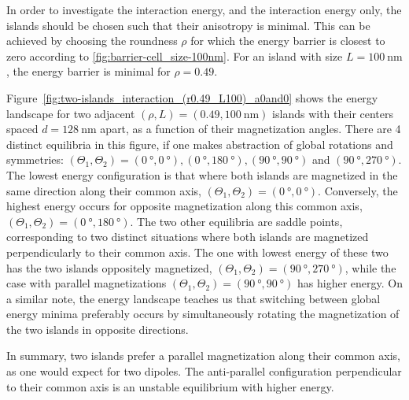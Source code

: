 \documentclass[11pt,a4paper,english]{article}
\begin{document}
In order to investigate the interaction energy, and the interaction energy only, the islands should be chosen such that their anisotropy is minimal. This can be achieved by choosing the roundness $\rho$ for which the energy barrier is closest to zero according to \cref{fig:barrier-cell_size-100nm}. For an island with size $L=\SI{100}{\nano\metre}$, the energy barrier is minimal for $\rho=0.49$. \par
Figure~\ref{fig:two-islands_interaction_(r0.49_L100)_a0and0} shows the energy landscape for two adjacent $(\rho, L)=(0.49, \SI{100}{\nano\metre})$ islands with their centers spaced $d=\SI{128}{\nano\metre}$ apart, as a function of their magnetization angles. There are 4 distinct equilibria in this figure, if one makes abstraction of global rotations and symmetries: $(\Theta_1, \Theta_2) = (\SI{0}{\degree},\SI{0}{\degree}), (\SI{0}{\degree}, \SI{180}{\degree}), (\SI{90}{\degree}, \SI{90}{\degree})$ and $(\SI{90}{\degree}, \SI{270}{\degree})$. The lowest energy configuration is that where both islands are magnetized in the same direction along their common axis, $(\Theta_1, \Theta_2) = (\SI{0}{\degree},\SI{0}{\degree})$. Conversely, the highest energy occurs for opposite magnetization along this common axis, $(\Theta_1, \Theta_2) = (\SI{0}{\degree},\SI{180}{\degree})$. The two other equilibria are saddle points, corresponding to two distinct situations where both islands are magnetized perpendicularly to their common axis. The one with lowest energy of these two has the two islands oppositely magnetized, $(\Theta_1, \Theta_2) = (\SI{90}{\degree}, \SI{270}{\degree})$, while the case with parallel magnetizations $(\Theta_1, \Theta_2) = (\SI{90}{\degree}, \SI{90}{\degree})$ has higher energy. On a similar note, the energy landscape teaches us that switching between global energy minima preferably occurs by simultaneously rotating the magnetization of the two islands in opposite directions. \par
In summary, two islands prefer a parallel magnetization along their common axis, as one would expect for two dipoles. The anti-parallel configuration perpendicular to their common axis is an unstable equilibrium with higher energy.
\end{document}
